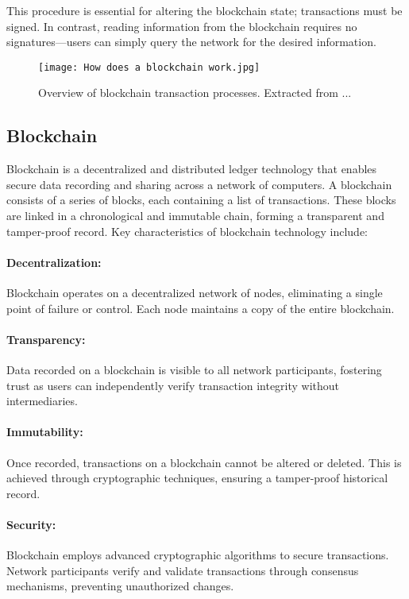 This procedure is essential for altering the blockchain state; transactions
must be signed. In contrast, reading information from the blockchain requires
no signatures—users can simply query the network for the desired information.

\begin{figure}[H]
    \centering
    \texttt{[image: How does a blockchain work.jpg]}
    \caption[How does a blockchain work]{Overview of blockchain transaction processes. Extracted from ...}
    \label{fig:how_does_a_blockchain_work}
\end{figure}

\subsection{Blockchain}
\label{subsec:blockchain}

Blockchain is a decentralized and distributed ledger technology that enables
secure data recording and sharing across a network of computers. A blockchain
consists of a series of blocks, each containing a list of transactions. These
blocks are linked in a chronological and immutable chain, forming a transparent
and tamper-proof record. Key characteristics of blockchain technology include:

\paragraph{Decentralization:}
Blockchain operates on a decentralized network of nodes, eliminating a single
point of failure or control. Each node maintains a copy of the entire
blockchain.

\paragraph{Transparency:}
Data recorded on a blockchain is visible to all network participants, fostering
trust as users can independently verify transaction integrity without
intermediaries.

\paragraph{Immutability:}
Once recorded, transactions on a blockchain cannot be altered or deleted. This
is achieved through cryptographic techniques, ensuring a tamper-proof
historical record.

\paragraph{Security:}
Blockchain employs advanced cryptographic algorithms to secure transactions.
Network participants verify and validate transactions through consensus
mechanisms, preventing unauthorized changes.


